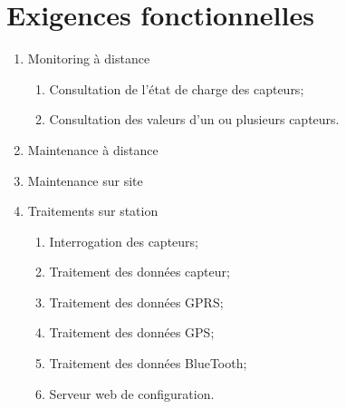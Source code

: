 
\section{Exigences fonctionnelles}

    \begin{enumerate}

    
        \item Monitoring à distance
            \begin{enumerate}
                \item Consultation de l'état de charge des capteurs;
                \item Consultation des valeurs d'un ou plusieurs
                         capteurs.
            \end{enumerate}

        \item Maintenance à distance
        
        \item Maintenance sur site

        \item Traitements sur station
            \begin{enumerate}
                \item Interrogation des capteurs;
                \item Traitement des données capteur;
                \item Traitement des données GPRS;
                \item Traitement des données GPS;
                \item Traitement des données BlueTooth;
                \item Serveur web de configuration.
            \end{enumerate}
    \end{enumerate}

